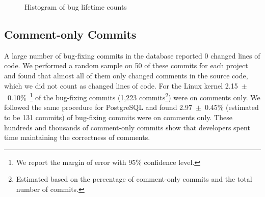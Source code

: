 \begin{figure}[tbh]
\centering
{}
\caption{Histogram of bug lifetime counts}
\label{fig-bug-lifetime} %
\end{figure}

\subsection{Comment-only Commits}
\label{sec-comment-only}
A large number of bug-fixing commits in the database
reported 0 changed lines of code. We performed a random sample on 50 of these
commits for each project and found that almost all of them only changed comments in the
source code, which we did not count as changed lines of code. For the Linux kernel 
2.15~$\pm$~0.10\%~\footnote{We report
the margin of error with 95\% confidence level.} 
of the bug-fixing
commits (1,223 commits\footnote{Estimated based on the percentage of comment-only
commits and the total number of commits.}) were on comments only. We followed the same procedure for
PostgreSQL and found 2.97~$\pm$~0.45\% (estimated to be 131 commits) of bug-fixing commits were on
comments only.
These hundreds and thousands of comment-only commits show that developers spent time maintaining
the correctness of comments.

